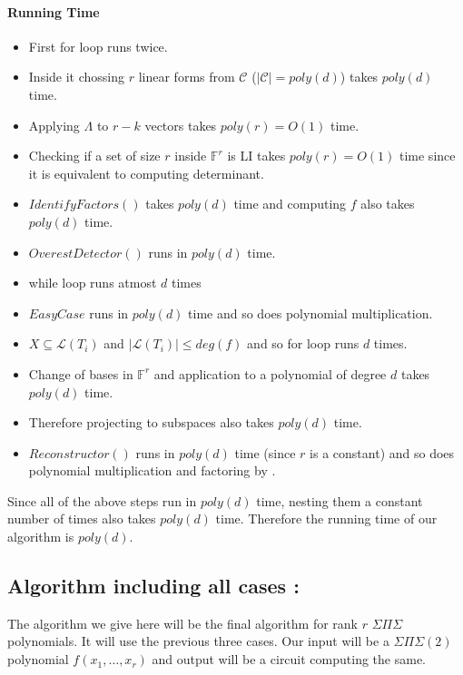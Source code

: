 \documentclass[letterpaper,USenglish,numberwithinsect]{lipics}
\newcommand{\F}{\mathbb{F}}
\newcommand{\ML}{\mathcal{L}}
\newcommand{\MC}{\mathcal{C}}
\begin{document}
\paragraph{Running Time}
\begin{itemize}
 \item First for loop runs twice.
 \item Inside it chossing $r$ linear forms from $\MC$ ($|\MC| = poly(d)$) takes $poly(d)$ time.
 \item Applying $\Lambda$ to $r-k$ vectors takes $poly(r) = O(1)$ time.
 \item Checking if a set of size $r$ inside $\F^r$ is LI takes $poly(r)=O(1)$ time since it is equivalent to
 computing determinant.
 \item $IdentifyFactors()$ takes $poly(d)$ time and computing $f$ also takes $poly(d)$ time.
 \item $OverestDetector()$ runs in $poly(d)$ time.
 \item while loop runs atmost $d$ times
 \item $EasyCase$ runs in $poly(d)$ time and so does polynomial multiplication.
 \item $X\subseteq \ML(T_i)$ and $|\ML(T_i)|\leq deg(f)$ and so for loop runs $d$ times.
 \item Change of bases in $\F^r$ and application to a polynomial of degree $d$ takes $poly(d)$ time.
 \item Therefore projecting to subspaces also takes $poly(d)$ time.
 \item $Reconstructor()$ runs in $poly(d)$ time (since $r$ is a constant) and so does polynomial
 multiplication and factoring by \cite{KalTr90}.
\end{itemize}
Since all of the above steps run in $poly(d)$ time, nesting them a constant number of
times also takes $poly(d)$ time. Therefore the running time of our algorithm is $poly(d)$.

\subsection{Algorithm including all cases : }

The algorithm we give here will be the final algorithm for rank $r$
$\Sigma\Pi\Sigma$ polynomials. It will use the previous three cases.
Our input will be a $\Sigma\Pi\Sigma(2)$ polynomial $f(x_1,\ldots,x_r)$ and
output will be a circuit computing the same.
\end{document}
